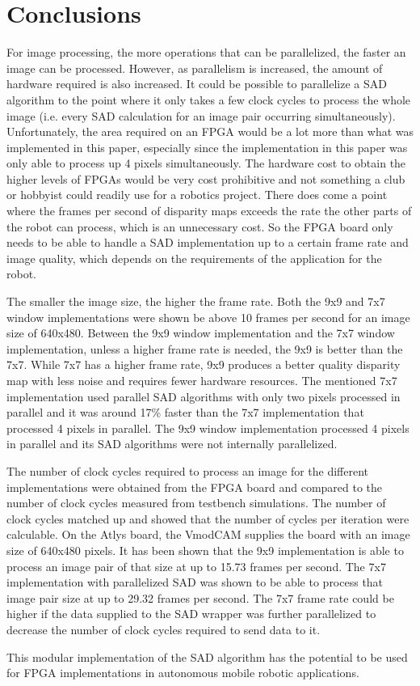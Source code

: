 \chapter{Conclusions}
\label{sec:concl}

For image processing, the more operations that can be parallelized, the faster an image can be processed. However, as parallelism is increased, the amount of hardware required is also increased. It could be possible to parallelize a SAD algorithm to the point where it only takes a few clock cycles to process the whole image (i.e. every SAD calculation for an image pair occurring simultaneously). Unfortunately, the area required on an FPGA would be a lot more than what was implemented in this paper, especially since the implementation in this paper was only able to process up 4 pixels simultaneously. The hardware cost to obtain the higher levels of FPGAs would be very cost prohibitive and not something a club or hobbyist could readily use for a robotics project. There does come a point where the frames per second of disparity maps exceeds the rate the other parts of the robot can process, which is an unnecessary cost. So the FPGA board only needs to be able to handle a SAD implementation up to a certain frame rate and image quality, which depends on the requirements of the application for the robot.

The smaller the image size, the higher the frame rate. Both the 9x9 and 7x7 window implementations were shown be above 10 frames per second for an image size of 640x480. Between the 9x9 window implementation and the 7x7 window implementation, unless a higher frame rate is needed, the 9x9 is better than the 7x7. While 7x7 has a higher frame rate, 9x9 produces a better quality disparity map with less noise and requires fewer hardware resources. The mentioned 7x7 implementation used parallel SAD algorithms with only two pixels processed in parallel and it was around 17\% faster than the 7x7 implementation that processed 4 pixels in parallel. The 9x9 window implementation processed 4 pixels in parallel and its SAD algorithms were not internally parallelized.

The number of clock cycles required to process an image for the different implementations were obtained from the FPGA board and compared to the number of clock cycles measured from testbench simulations. The number of clock cycles matched up and showed that the number of cycles per iteration were calculable. On the Atlys board, the VmodCAM supplies the board with an image size of 640x480 pixels. It has been shown that the 9x9 implementation is able to process an image pair of that size at up to 15.73 frames per second. The 7x7 implementation with parallelized SAD was shown to be able to process that image pair size at up to 29.32 frames per second. The 7x7 frame rate could be higher if the data supplied to the SAD wrapper was further parallelized to decrease the number of clock cycles required to send data to it.

This modular implementation of the SAD algorithm has the potential to be used for FPGA implementations in autonomous mobile robotic applications.